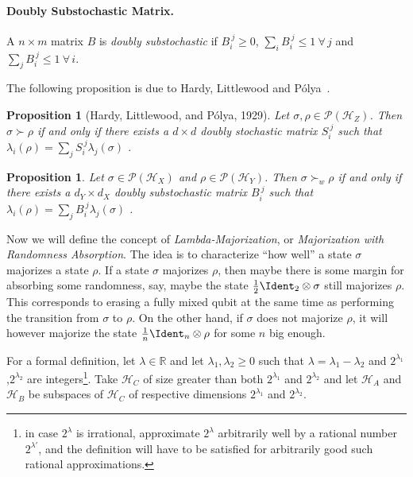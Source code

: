 \documentclass[11pt,a4paper]{article}
\theoremstyle{plain}
\newtheorem{prop}[thm]{Proposition}
\def\Hs{\mathscr{H}}%
\newcommand{\POps}{\mathscr{P}}
\begin{document}
\paragraph{Doubly Substochastic Matrix.} A $n\times m$ matrix $B$ is {\em doubly substochastic} if
$B_i^{~j}\geqslant 0$, $\sum_i B_i^{~j} \leqslant 1~\forall\,j$ and $\sum_j B_i^{~j} \leqslant 1~\forall\,i$.

The following proposition is due to Hardy, Littlewood and P\'olya~\cite{HardyLittlewoodPolyaInequalities1952}.

\begin{prop}[Hardy, Littlewood, and P\'olya, 1929]
  \label{prop:MajDblStochEquiv}
  Let $\sigma,\rho \in \POps(\Hs_Z)$. Then $\sigma\succ\rho$ if and only if there exists a $d\times d$
  doubly stochastic matrix $S_i^{~j}$ such that $\lambda_i(\rho) = \sum_j S_i^{~j}\lambda_j(\sigma)$ .
\end{prop}

\begin{prop}
  \label{prop:WeakMajDblSubstochEquiv}
  Let $\sigma \in \POps(\Hs_X)$ and $\rho\in\POps(\Hs_Y)$. Then $\sigma\succ_w\rho$ if and only if there
  exists a $d_Y \times d_X$ doubly substochastic matrix $B_i^{~j}$ such that
  $\lambda_i(\rho) = \sum_j B_i^{~j}\lambda_j(\sigma)$ .
\end{prop}


Now we will define the concept of {\em Lambda-Majorization}, or {\em Majorization with Randomness Absorption}.
The idea is to characterize ``how well'' a state $\sigma$ majorizes a state $\rho$. If a state $\sigma$ majorizes
$\rho$, then maybe there is some margin for absorbing some randomness, say, maybe the state
$\frac12\Ident_2\otimes\sigma$ still majorizes $\rho$. This corresponds to erasing a fully mixed qubit at the same time
as performing the transition from $\sigma$ to $\rho$. On the other hand, if $\sigma$
does not majorize $\rho$, it will however majorize the state $\frac1n\Ident_n\otimes\rho$ for some $n$ big enough.

For a formal definition, let $\lambda\in\mathbb{R}$ and let $\lambda_1,\lambda_2\geqslant 0$ such that
$\lambda = \lambda_1-\lambda_2$ and $2^{\lambda_1}$,$2^{\lambda_2}$ are integers\footnote{in case $2^\lambda$ is
  irrational, approximate $2^\lambda$ arbitrarily well by a rational number $2^{\lambda'}$, and the definition
  will have to be satisfied for arbitrarily good such rational approximations.}.
Take $\Hs_C$ of size greater than both $2^{\lambda_1}$ and $2^{\lambda_2}$ and let $\Hs_A$ and $\Hs_B$ be subspaces
of $\Hs_C$ of respective dimensions $2^{\lambda_1}$ and $2^{\lambda_2}$.
\end{document}
